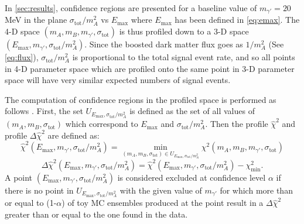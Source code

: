 In \cref{sec:results}, confidence regions are presented for a baseline value of $m_{\gamma '}=20$ MeV in the plane $\sigma_\textrm{tot}/m_A^2$ vs $E_\textrm{max}$ where $E_\textrm{max}$ has been defined in \cref{eq:emax}.  The 4-D space $(m_A,m_B,m_{\gamma '},\sigma_\textrm{tot})$ is thus profiled down to a 3-D space $(E_\textrm{max},m_{\gamma '},\sigma_\textrm{tot}/m_A^2)$.  Since the boosted dark matter flux goes as $1/m_A^2$ (See \cref{eq:flux}), $\sigma_\textrm{tot}/m_A^2$ is proportional to the total signal event rate, and so all points in 4-D parameter space which are profiled onto the same point in 3-D parameter space will have very similar expected numbers of signal events.

The computation of confidence regions in the profiled space is performed as follows \cite{Olive:2016xmw}.  First, the set $U_{E_\textrm{max},\sigma_\textrm{tot}/m_A^2}$ is defined as the set of all values of $(m_A,m_B,\sigma_\textrm{tot})$ which correspond to $E_\textrm{max}$ and $\sigma_\textrm{tot}/m_A^2$.  Then the profile $\hat{\chi}^2$ and profile $\Delta \hat{\chi}^2$ are defined as:
\begin{equation}
\hat{\chi}^2(E_\textrm{max},m_{\gamma '},\sigma_\textrm{tot}/m_A^2)=\min \limits_{(m_A,m_B,\sigma_\textrm{tot})\in U_{E_\textrm{max},\sigma_\textrm{tot}/m_A^2}} \chi^2(m_A,m_B,m_{\gamma '},\sigma_\textrm{tot})
\end{equation}
\begin{equation}
\Delta \hat{\chi}^2(E_\textrm{max},m_{\gamma '},\sigma_\textrm{tot}/m_A^2)=\hat{\chi}^2(E_\textrm{max},m_{\gamma '},\sigma_\textrm{tot}/m_A^2)-\chi^2_\textrm{min}.
\end{equation}
A point $(E_\textrm{max},m_{\gamma '},\sigma_\textrm{tot}/m_A^2)$ is considered excluded at confidence level $\alpha$ if there is no point in $U_{E_\textrm{max},\sigma_\textrm{tot}/m_A^2}$ with the given value of $m_{\gamma '}$ for which more than or equal to (1-$\alpha$) of toy MC ensembles produced at the point result in a $\Delta \hat{\chi}^2$ greater than or equal to the one found in the data.






